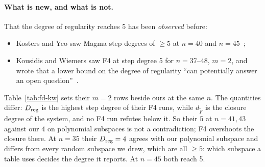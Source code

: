 \begin{table}[p]
\centering\scriptsize\setlength{\tabcolsep}{3.5pt}

\caption[Per-instance closures, random subspaces]{Per-instance closures of
the binary $m=2$ descent, random subspaces (R: curve-derived $z$; U: uniform
$z$; T: inside $\ker\operatorname{Tr}$). Columns as in
Table~\ref{tab:bin-fd-inst-a}. R35a is listed as $\ge5$, as recorded in
\texttt{instances.json}; Theorem~\ref{thm:lfdexact} makes it exactly 5 by
branching (Lemma~\ref{lem:branch}). R39a and R39b have no certificate.}
\label{tab:bin-fd-inst-b}
\end{table}

\begin{table}[t]
\centering\scriptsize\setlength{\tabcolsep}{3pt}

\caption[]{The 13 VALID certificate checks of $1\notin W_4(F)$: $m=2$
instances (Q: the two satisfiable random-subspace instances, with their
Boolean solution counts) and the $m=t=3$ chain instances C19a, C19b.
$\dim W_d$ is the cumulative dimension of $W_4\cap B_{\le d}$; ``codim
$\ge$'' is the certified bound; closure and check seconds as printed by
\texttt{verify/cert\_batch.py} (wall time of system generation, closure and
certificate export; P45a's entry is a hand-written approximation; see the
text for its other two timings). Data:
, from
and \texttt{instances\_sat.json}.}
\label{tab:bin-fd-certs}
\end{table}

\paragraph{What is new, and what is not.} That the degree of regularity
reaches 5 has been \emph{observed} before:
\begin{itemize}
\item Kosters and Yeo saw Magma step degrees of $\ge5$ at $n=40$ and
  $n=45$~\cite{kosters2015notes};
\item Kousidis and Wiemers saw F4 at step degree 5 for $n=37$--$48$, $m=2$,
  and wrote that a lower bound on the degree of regularity ``can
  potentially answer an open question''~\cite{kousidis2019}.
\end{itemize}
Table~\ref{tab:fd-kw} sets their $m=2$ rows beside ours at the same
$n$. The quantities differ: $D_{\rm reg}$ is the highest step degree of
their F4 runs, while $d_{\tilde F}$ is the closure degree of the system,
and no F4 run refutes below it. So their $5$ at $n=41,43$ against our $4$
on polynomial subspaces is not a contradiction; F4 overshoots the closure
there. At $n=35$ their $D_{\rm reg}=4$ agrees with our polynomial subspace
and differs from every random subspace we drew, which are all $\ge5$:
which subspace a table uses decides the degree it reports. At $n=45$ both
reach 5.

